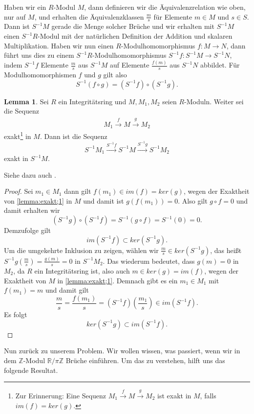 \documentclass[11pt,titlepage]{article}
\newcommand{\setZ}{\mathbb{Z}}
\newcommand{\setR}{\mathbb{R}}
\theoremstyle{definition}
\newtheorem{lemma}[theorem]{Lemma}
\theoremstyle{remark}
\begin{document}
	Haben wir ein $R$-Modul $M$, dann definieren wir 
	die Äquivalenzrelation wie oben, nur auf $M$, und erhalten die 
	Äquivalenzklassen $\frac{m}{s}$ für Elemente $m\in M$ und $s\in S$. 
	Dann ist $S^{-1}M$ gerade die Menge solcher Brüche und wir erhalten 
	mit $S^{-1}M$ einen $S^{-1}R$-Modul mit der natürlichen Definition 
	der Addition und skalaren Multiplikation. Haben wir nun einen 
	$R$-Modulhomomorphismus $f:M\to N$, dann führt uns dies zu einem 
	$S^{-1}R$-Modulhomomorphismus $S^{-1}f:S^{-1}M\to S^{-1}N$, indem $S^{-1}f$ 
	Elemente $\frac{m}{s}$ aus $S^{-1}M$ auf Elemente $\frac{f(m)}{s}$ 
	aus $S^{-1}N$ abbildet. Für Modulhomomorphismen $f$ und $g$ gilt also 
	\[S^{-1}(f\circ g)=(S^{-1}f)\circ(S^{-1}g).\]
	
	\begin{lemma} \label{lemma:Buch;exakt}
		Sei $R$ ein Integritätsring und $M,M_1,M_2$ seien $R$-Moduln. Weiter 
		sei die Sequenz
		\begin{align}
			M_1\xrightarrow{f}M\xrightarrow{g}M_2 \label{lemma:exakt;1}
		\end{align}
		exakt\footnote{Zur Erinnerung: Eine Sequenz $M_1\xrightarrow{f}M\xrightarrow{g}M_2$ ist exakt in $M$, falls 
			$im(f)=ker(g)$.} in $M$. Dann ist die Sequenz
		\[S^{-1}M_1 \xrightarrow{S^{-1}f}S^{-1}M\xrightarrow{S^{-1}g}S^{-1}M_2\]
		exakt in $S^{-1}M$.
	\end{lemma}
	
	Siehe dazu auch \cite[Proposition 3.3]{introductiontocomalg}.
	
	\begin{proof}
		Sei $m_1\in M_1$ dann gilt $f(m_1)\in im(f)=ker(g)$, wegen der Exaktheit 
		von \ref{lemma:exakt;1} in $M$ und damit ist $g(f(m_1))=0$. Also gilt 
		$g\circ f=0$ und damit erhalten wir
		\[(S^{-1}g) \circ (S^{-1}f) = S^{-1}(g\circ f)=S^{-1}(0)=0.\]
		Demzufolge gilt
		\[im(S^{-1}f)\subset ker(S^{-1}g).\]
		Um die umgekehrte Inklusion zu zeigen, wählen wir 
		$\frac{m}{s}\in ker(S^{-1}g)$, das heißt $S^{-1}g\left(\frac{m}{s}\right)=\frac{g(m)}{s}=0$ in $S^{-1}M_2$. 
		Das wiederum bedeutet, dass $g(m)=0$ in $M_2$, da $R$ ein Integritätsring 
		ist, also auch $m\in ker(g)=im(f)$, wegen der Exaktheit von $M$ in 
		\ref{lemma:exakt;1}. Demnach gibt es ein $m_1\in M_1$ mit $f(m_1)=m$ und damit 
		gilt
		\[\frac{m}{s}=\frac{f(m_1)}{s}=(S^{-1}f)\left(\frac{m_1}{s}\right)\in im(S^{-1}f).\]
		Es folgt 
		\[ker(S^{-1}g)\subset im(S^{-1}f).\]
	\end{proof}

	Nun zurück zu unserem Problem. Wir wollen wissen, was passiert, wenn 
	wir in dem $\setZ$-Modul $\setR /\pi\setZ$ Brüche einführen. Um das 
	zu verstehen, hilft uns das folgende Resultat.
	
\end{document}
